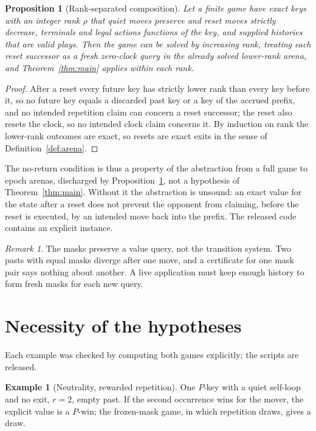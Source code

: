 \documentclass[journal]{IEEEtran}
\newtheorem{proposition}{Proposition}
\theoremstyle{definition}
\newtheorem{example}{Example}
\theoremstyle{remark}
\newtheorem{remark}{Remark}
\begin{document}
\begin{proposition}[Rank-separated composition]\label{prop:compose}
Let a finite game have exact keys with an integer rank $\rho$ that quiet moves preserve and reset moves strictly decrease, terminals and legal actions functions of the key, and supplied histories that are valid plays. Then the game can be solved by increasing rank, treating each reset successor as a fresh zero-clock query in the already solved lower-rank arena, and Theorem~\ref{thm:main} applies within each rank.
\end{proposition}
\begin{proof}
After a reset every future key has strictly lower rank than every key before it, so no future key equals a discarded past key or a key of the accrued prefix, and no intended repetition claim can concern a reset successor; the reset also resets the clock, so no intended clock claim concerns it. By induction on rank the lower-rank outcomes are exact, so resets are exact exits in the sense of Definition~\ref{def:arena}.
\end{proof}

The no-return condition is thus a property of the abstraction from a full game to epoch arenas, discharged by Proposition~\ref{prop:compose}, not a hypothesis of Theorem~\ref{thm:main}. Without it the abstraction is unsound: an exact value for the state after a reset does not prevent the opponent from claiming, before the reset is executed, by an intended move back into the prefix. The released code contains an explicit instance.

\begin{remark}
The masks preserve a value query, not the transition system. Two pasts with equal masks diverge after one move, and a certificate for one mask pair says nothing about another. A live application must keep enough history to form fresh masks for each new query.
\end{remark}

\section{Necessity of the hypotheses}\label{sec:necessity}

Each example was checked by computing both games explicitly; the scripts are released.

\begin{example}[Neutrality, rewarded repetition]
One $P$-key with a quiet self-loop and no exit, $r=2$, empty past. If the second occurrence wins for the mover, the explicit value is a $P$-win; the frozen-mask game, in which repetition draws, gives a draw.
\end{example}
\end{document}
